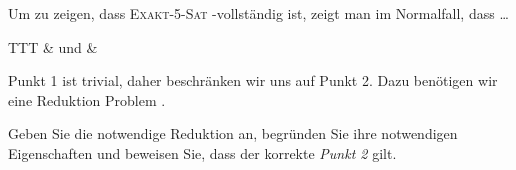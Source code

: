 \documentclass{scrartcl}
\begin{document}
\vspace{\baselineskip}
Um zu zeigen, dass \textsc{Exakt-5-Sat} \NP-vollständig ist, zeigt man im Normalfall,
dass \ldots

\newsavebox\topalignbox
{}

\begin{center}
   \begin{tabular}{TTT}
      \setlength{\fboxsep}{2pt}
      & und & 
      \setlength{\fboxsep}{2pt}
   \end{tabular}
\end{center}

{\setlength\fboxsep{2pt}
   Punkt 1 ist trivial, daher beschränken wir uns auf Punkt 2. Dazu benötigen wir
   eine Reduktion  Problem
    .
}

\vspace{3pt}
Geben Sie die notwendige Reduktion an, begründen Sie ihre notwendigen
Eigenschaften und beweisen Sie, dass der korrekte \emph{Punkt 2} gilt.
\end{document}

